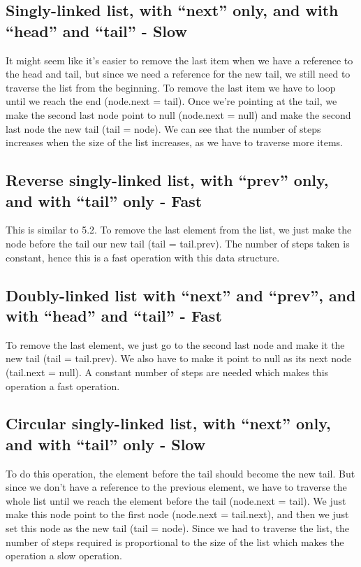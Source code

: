 \documentclass{article}
\begin{document}
\subsection{Singly-linked list, with “next” only, and with “head” and “tail” - Slow}
It might seem like it's easier to remove the last item when we have a reference to the head and tail, but since we need a reference for the new tail, we still need to traverse the list from the beginning. To remove the last item we have to loop until we reach the end (node.next = tail). Once we're pointing at the tail, we make the second last node point to null (node.next = null) and make the second last node the new tail (tail = node). We can see that the number of steps increases when the size of the list increases, as we have to traverse more items.

\subsection{Reverse singly-linked list, with “prev” only, and with “tail” only - Fast}
This is similar to 5.2. To remove the last element from the list, we just make the node before the tail our new tail (tail = tail.prev). The number of steps taken is constant, hence this is a fast operation with this data structure.

\subsection{Doubly-linked list with “next” and “prev”, and with “head” and “tail” - Fast}
To remove the last element, we just go to the second last node and make it the new tail (tail = tail.prev). We also have to make it point to null as its next node (tail.next = null). A constant number of steps are needed which makes this operation a fast operation.

\subsection{Circular singly-linked list, with “next” only, and with “tail” only - Slow}
To do this operation, the element before the tail should become the new tail. But since we don't have a reference to the previous element, we have to traverse the whole list until we reach the element before the tail (node.next = tail). We just make this node point to the first node (node.next = tail.next), and then we just set this node as the new tail (tail = node). Since we had to traverse the list, the number of steps required is proportional to the size of the list which makes the operation a slow operation.
\end{document}
